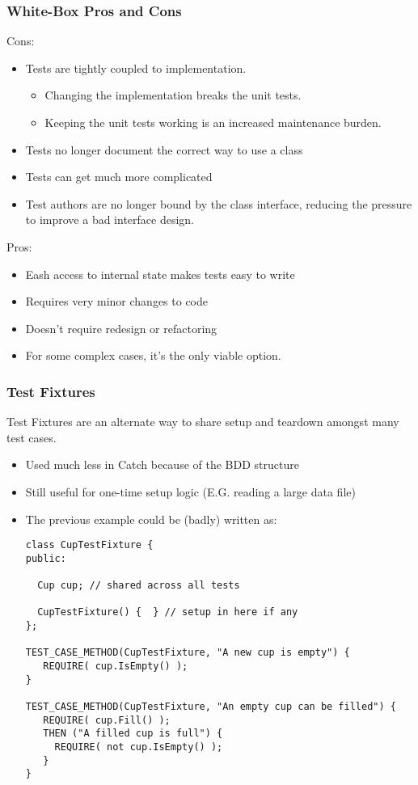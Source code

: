 \begin{frame}[fragile,t]
\frametitle{White-Box Pros and Cons}

Cons:
\begin{itemize}
\item Tests are tightly coupled to implementation.
\begin{itemize}
  \item Changing the implementation breaks the unit tests.
  \item Keeping the unit tests working is an increased maintenance burden.
\end{itemize}
\item Tests no longer document the correct way to use a class
\item Tests can get much more complicated
\item Test authors are no longer bound by the class interface,
  reducing the pressure to improve a bad interface design.
\end{itemize}

Pros:
\begin{itemize}
\item Eash access to internal state makes tests easy to write
\item Requires very minor changes to code
\item Doesn't require redesign or refactoring
\item For some complex cases, it's the only viable option.
\end{itemize}


\end{frame}


\begin{frame}[fragile,t]
\frametitle{Test Fixtures}
Test Fixtures are an alternate way to share setup and teardown amongst
many test cases.
\begin{itemize}
\item Used much less in Catch because of the BDD structure
\item Still useful for one-time setup logic (E.G. reading a large data
  file)
\item The previous example could be (badly) written as:
{\scriptsize \begin{verbatim}
class CupTestFixture {
public:

  Cup cup; // shared across all tests

  CupTestFixture() {  } // setup in here if any
};

TEST_CASE_METHOD(CupTestFixture, "A new cup is empty") {
   REQUIRE( cup.IsEmpty() );
}

TEST_CASE_METHOD(CupTestFixture, "An empty cup can be filled") {
   REQUIRE( cup.Fill() );
   THEN ("A filled cup is full") {
     REQUIRE( not cup.IsEmpty() );
   }
}
\end{verbatim}}
\end{itemize}
\end{frame}

